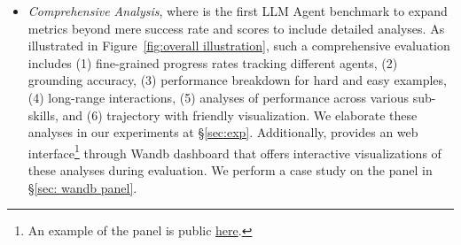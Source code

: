 \begin{itemize}[before=\vspace{-1mm}, leftmargin=10pt]
    \item \textit{Comprehensive Analysis}, where \BenchName{} is the first LLM Agent benchmark to expand metrics beyond mere success rate and scores to include detailed analyses.
    As illustrated in Figure~\ref{fig:overall illustration}, such a comprehensive evaluation includes (1) fine-grained progress rates tracking different agents, (2) grounding accuracy, (3) performance breakdown for hard and easy examples, (4) long-range interactions, (5) analyses of performance across various sub-skills, and (6) trajectory with friendly visualization. 
    We elaborate these analyses in our experiments at \S \ref{sec:exp}.
    Additionally, \BenchName{} provides an web interface\footnote{\label{wandb link}An example of the panel is public \href{https://wandb.ai/agentboard/llm-agent-eval-gpt-4-all}{here}.} through Wandb dashboard that offers interactive visualizations of these analyses during evaluation. We perform a case study on the panel in \S \ref{sec: wandb panel}.
\end{itemize}





